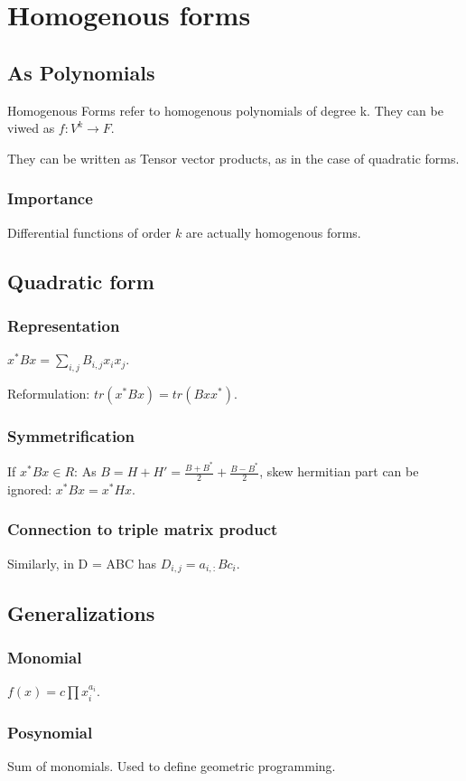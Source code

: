 \documentclass[oneside, article]{memoir}
\begin{document}
\chapter{Homogenous forms}
\section{As Polynomials}
Homogenous Forms refer to homogenous polynomials of degree k. They can be viwed as $f:V^{k} \to F$.

They can be written as Tensor vector products, as in the case of quadratic forms.

\subsection{Importance}
Differential functions of order $k$ are actually homogenous forms.

\section{Quadratic form}
\subsection{Representation}
$x^{*}Bx = \sum_{i,j} B_{i,j}x_{i}x_{j}$.

Reformulation: $tr(x^{*}Bx) = tr(Bxx^{*})$.

\subsection{Symmetrification}
If $x^{*}Bx \in R$: As $B = H+ H' = \frac{B+B^{*}}{2} + \frac{B-B^{*}}{2}$, skew hermitian part can be ignored: $x^{*}Bx = x^{*}Hx$.

\subsection{Connection to triple matrix product}
Similarly, in D = ABC has $D_{i,j} = a_{i,:}Bc_{i}$.

\section{Generalizations}
\subsection{Monomial}
$f(x) = c \prod x_i^{a_i}$.

\subsection{Posynomial}
Sum of monomials. Used to define geometric programming.
\end{document}
